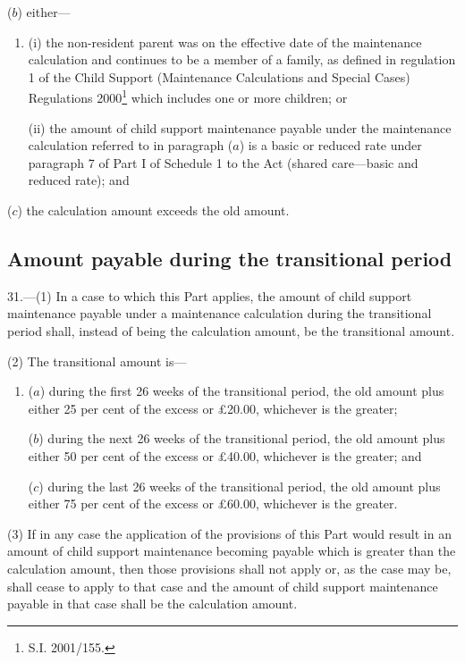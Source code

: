\documentclass[12pt,a4paper]{article}
\begin{document}
\begin{enumerate}
($b$) either—
\begin{enumerate}\item[]
(i) the non-resident parent was on the effective date of the maintenance calculation and continues to be a member of a family, as defined in regulation 1 of the Child Support (Maintenance Calculations and Special Cases) Regulations 2000\footnote{\frenchspacing S.I. 2001/155.} which includes one or more children; or

(ii) the amount of child support maintenance payable under the maintenance calculation referred to in paragraph ($a$)  is a basic or reduced rate under paragraph 7 of Part I of Schedule 1 to the Act (shared care—basic and reduced rate); and
\end{enumerate}

($c$) the calculation amount exceeds the old amount.
\end{enumerate}

\subsection[31. Amount payable during the transitional period]{Amount payable during the transitional period}

31.---(1)  In a case to which this Part applies, the amount of child support maintenance payable under a maintenance calculation during the transitional period shall, instead of being the calculation amount, be the transitional amount.

(2) The transitional amount is—
\begin{enumerate}\item[]
($a$) during the first 26 weeks of the transitional period, the old amount plus either 25 per cent of the excess or £20.00, whichever is the greater;

($b$) during the next 26 weeks of the transitional period, the old amount plus either 50 per cent of the excess or £40.00, whichever is the greater; and

($c$) during the last 26 weeks of the transitional period, the old amount plus either 75 per cent of the excess or £60.00, whichever is the greater.
\end{enumerate}

(3) If in any case the application of the provisions of this Part would result in an amount of child support maintenance becoming payable which is greater than the calculation amount, then those provisions shall not apply or, as the case may be, shall cease to apply to that case and the amount of child support maintenance payable in that case shall be the calculation amount.
\end{document}
